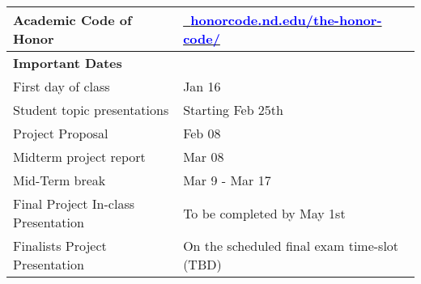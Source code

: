 \begin{center}
\begin{longtable}{ p{} p{} }
\textbf{Academic Code of Honor} & \href{http://honorcode.nd.edu/the-honor-code/}{\textcolor{blue}{~\url{honorcode.nd.edu/the-honor-code/}}}\\
\midrule
\textbf{Important Dates }	& \\
First day of class  			& Jan 16 \\
Student topic presentations 	& Starting Feb 25th \\
Project Proposal 			& Feb 08 \\
Midterm project report 		& Mar 08 \\
Mid-Term break 				& Mar 9 - Mar 17 \\
Final Project In-class 
Presentation 				& To be completed by May 1st\\
Finalists Project 
Presentation 				& On the scheduled final exam time-slot (TBD)\\


\end{longtable}
\end{center}%